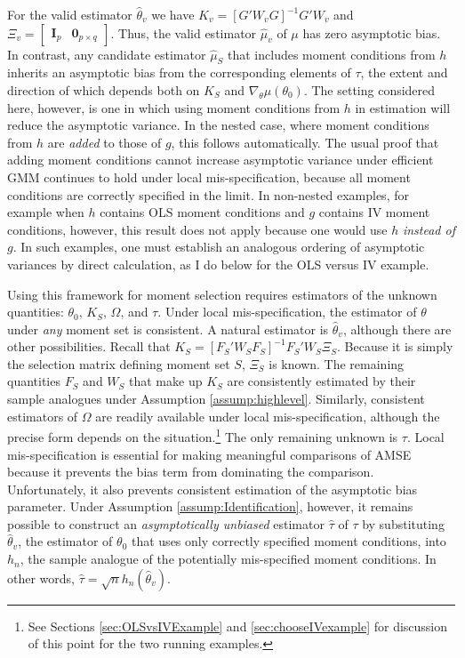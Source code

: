 For the valid estimator $\widehat{\theta}_v$ we have $K_v = \left[G'W_{v}G\right]^{-1}G' W_{v}$ and $\Xi_v =\left[\begin{array}{cc} \mathbf{I}_p& \mathbf{0}_{p\times q} \end{array} \right]$. 
Thus, the valid estimator $\widehat{\mu}_v$ of $\mu$ has zero asymptotic bias. 
In contrast, any candidate estimator $\widehat{\mu}_S$ that includes moment conditions from $h$ inherits an asymptotic bias from the corresponding elements of $\tau$, the extent and direction of which depends both on $K_S$ and $\nabla_\theta\mu(\theta_0)$. 
The setting considered here, however, is one in which using moment conditions from $h$ in estimation will reduce the asymptotic variance.
In the nested case, where moment conditions from $h$ are \emph{added} to those of $g$, this follows automatically.
The usual proof that adding moment conditions cannot increase asymptotic variance under efficient GMM \citep[see for example][ch.\ 6]{Hallbook} continues to hold under local mis-specification, because all moment conditions are correctly specified in the limit.
In non-nested examples, for example when $h$ contains OLS moment conditions and $g$ contains IV moment conditions, however, this result does not apply because one would use $h$ \emph{instead of} $g$.
In such examples, one must establish an analogous ordering of asymptotic variances by direct calculation, as I do below for the OLS versus IV example.

Using this framework for moment selection requires estimators of the unknown quantities: $\theta_0$, $K_S$, $\Omega$, and $\tau$. 
Under local mis-specification, the estimator of $\theta$ under \emph{any} moment set is consistent. 
A natural estimator is $\widehat{\theta}_v$, although there are other possibilities. 
Recall that $K_S = [F_S'W_SF_S]^{-1} F_S'W_S \Xi_S$.
Because it is simply the selection matrix defining moment set $S$, $\Xi_S$ is known.  
The remaining quantities $F_S$ and $W_S$ that make up $K_S$ are consistently estimated by their sample analogues under Assumption \ref{assump:highlevel}.
Similarly, consistent estimators of $\Omega$ are readily available under local mis-specification, although the precise form depends on the situation.\footnote{See Sections \ref{sec:OLSvsIVExample} and \ref{sec:chooseIVexample} for discussion of this point for the two running examples.}
The only remaining unknown is $\tau$. Local mis-specification is essential for making meaningful comparisons of AMSE because it prevents the bias term from dominating the comparison. 
Unfortunately, it also prevents consistent estimation of the asymptotic bias parameter.
Under Assumption \ref{assump:Identification}, however, it remains possible to construct an \emph{asymptotically unbiased} estimator $\widehat{\tau}$ of $\tau$ by substituting $\widehat{\theta}_v$, the estimator of $\theta_0$ that uses only correctly specified moment conditions, into $h_n$, the sample analogue of the potentially mis-specified moment conditions. 
In other words,  $\widehat{\tau} = \sqrt{n} h_n(\widehat{\theta}_v)$. 

